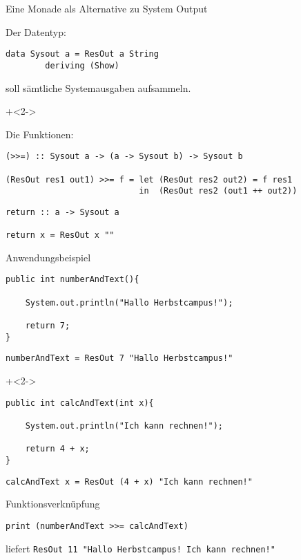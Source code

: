 \begin{frame}[fragile]{Eine Monade als Alternative zu System Output}

Der Datentyp:
\begin{lstlisting}
data Sysout a = ResOut a String
        deriving (Show)
\end{lstlisting}

soll sämtliche Systemausgaben aufsammeln.

\onslide+<2->
~

Die Funktionen:
\begin{lstlisting}
(>>=) :: Sysout a -> (a -> Sysout b) -> Sysout b

(ResOut res1 out1) >>= f = let (ResOut res2 out2) = f res1
                           in  (ResOut res2 (out1 ++ out2))
\end{lstlisting}


\begin{lstlisting}
return :: a -> Sysout a

return x = ResOut x ""
\end{lstlisting}


\end{frame}



\begin{frame}[fragile]{Anwendungsbeispiel}
\begin{lstlisting}
public int numberAndText(){

    System.out.println("Hallo Herbstcampus!");
    
    return 7;
}
\end{lstlisting}

\begin{lstlisting}
numberAndText =	ResOut 7 "Hallo Herbstcampus!"
\end{lstlisting}

\onslide+<2->

\begin{lstlisting}
public int calcAndText(int x){

    System.out.println("Ich kann rechnen!");
    
    return 4 + x;
}
\end{lstlisting}

\begin{lstlisting}
calcAndText x =	ResOut (4 + x) "Ich kann rechnen!"
\end{lstlisting}

\end{frame}


\begin{frame}[fragile]{Funktionsverknüpfung}

\begin{lstlisting}
print (numberAndText >>= calcAndText)
\end{lstlisting}
liefert \lstinline|ResOut 11 "Hallo Herbstcampus! Ich kann rechnen!"|

\end{frame}



